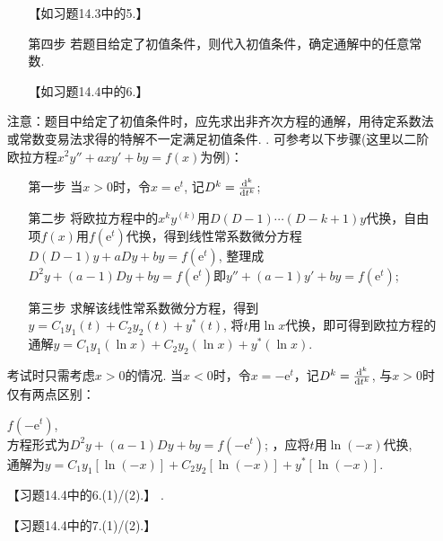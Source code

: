 \documentclass[12pt,UTF8,fleqn]{ctexart}
\newcommand{\md}[1]{\mathrm d#1}
\newcommand{\me}[0]{\mathrm e}
\begin{document}
\begin{enumerate}
\begin{enumerate}
【如习题14.3中的5.】
\item[第四步]若题目给定了初值条件，则代入初值条件，确定通解中的任意常数.

【如习题14.4中的6.】
\end{enumerate}
注意：题目中给定了初值条件时，应先求出非齐次方程的通解，用待定系数法或常数变易法求得的特解不一定满足初值条件.
. 可参考以下步骤(这里以二阶欧拉方程$x^2y''+axy'+by=f(x)$为例)：
\begin{enumerate}
\item[第一步]当$x>0$时，令$x=\me^t$, 记$D^k=\frac{\md^k}{\md t^k}$;
\item[第二步]将欧拉方程中的$x^ky^{(k)}$用$D(D-1)\cdots(D-k+1)y$代换，自由项$f(x)$用$f(\me^t)$代换，得到线性常系数微分方程$D(D-1)y+aDy+by=f(\me^t)$, 整理成$D^2y+(a-1)Dy+by=f(\me^t)$即$y''+(a-1)y'+by=f(\me^t)$;
\item[第三步]求解该线性常系数微分方程，得到$y=C_1y_1(t)+C_2y_2(t)+y^*(t)$, 将$t$用$\ln x$代换，即可得到欧拉方程的通解$y=C_1y_1(\ln x)+C_2y_2(\ln x)+y^*(\ln x)$.
\end{enumerate}
考试时只需考虑$x>0$的情况. 当$x<0$时，令$x=-\me^t$，记$D^k=\frac{\md^k}{\md t^k}$, 与$x>0$时仅有两点区别：
\begin{itemize}
$f(-\me^t)$, \\
方程形式为$D^2y+(a-1)Dy+by=f(-\me^t)$;
，应将$t$用$\ln(-x)$代换, \\
通解为$y=C_1y_1[\ln(-x)]+C_2y_2[\ln(-x)]+y^*[\ln(-x)]$.
\end{itemize}

【习题14.4中的6.(1)/(2).】
.

【习题14.4中的7.(1)/(2).】
\end{enumerate}
\end{document}
